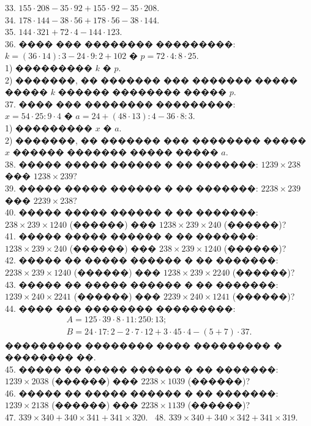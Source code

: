 \documentclass[12pt]{article}
\begin{document}
33. $155\cdot208-35\cdot92+155\cdot92-35\cdot208.$\\
34. $178\cdot144-38\cdot56+178\cdot56-38\cdot144.$\\
35. $144\cdot321+72\cdot4-144\cdot123.$\\
36. ���� ��� �������� ���������:\\
$k=(36\cdot14):3-24\cdot9:2+102$ � $p=72\cdot4:8\cdot25.$\\
1) ��������� $k$ � $p.$\\
2) �������, �� ������� ��� ������� ����� ����� $k$ ������ �������� ����� $p.$\\
37. ���� ��� �������� ���������:\\
$x=54\cdot25:9\cdot4$ � $a=24+(48\cdot13):4-36\cdot8:3.$\\
1) ��������� $x$ � $a.$\\
2) �������, �� ������� ��� �������� ����� $x$ ������ ������� ����� ����� $a.$\\
38. ����� ����� ������ � �� �������: $1239\times238$ ��� $1238\times239?$\\
39. ����� ����� ������ � �� �������: $2238\times239$ ��� $2239\times238?$\\
40. ����� ����� ������ � �� �������: $238\times239\times1240$ (������) ��� $1238\times239\times240$ (������)?\\
41. ����� ����� ������ � �� �������: $1238\times239\times240$ (������) ��� $238\times239\times1240$ (������)?\\
42. ����� �� ����� ������ � �� �������: $2238\times239\times1240$ (������) ��� $1238\times239\times2240$ (������)?\\
43. ����� �� ����� ������ � �� �������: $1239\times240\times2241$ (������) ��� $2239\times240\times1241$ (������)?\\
44. ���� ��� �������� ���������:
$$\begin{array}{l} A=125\cdot39\cdot8\cdot11:250:13;\\ B=24\cdot17:2-2\cdot7\cdot12+3\cdot45\cdot4-(5+7)\cdot37.\end{array}$$
��������� �������� ���� ��������� � �������� ��.\\
45. ����� �� ����� ������ � �� �������: $1239\times2038$ (������) ��� $2238\times1039$ (������)?\\
46. ����� �� ����� ������ � �� �������: $1239\times2138$ (������) ��� $2238\times1139$ (������)?\\
47. $339 \times 340 + 340 \times 341 + 341 \times 320.$ \
48. $339 \times 340 + 340 \times 342 + 341 \times 319.$
\newpage
\end{document}
